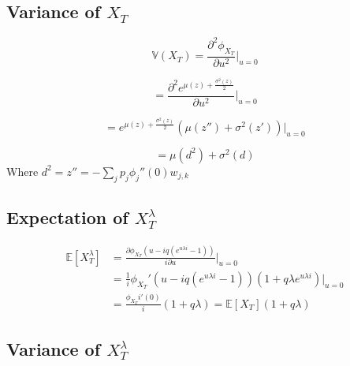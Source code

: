 \documentclass[12pt]{article}
\theoremstyle{definition}
\begin{document}
 \subsection{Variance of \(X_T\)}
 
\begin{equation}
\mathbb{V}(X_T)=\frac{\partial^2 \phi_{X_T}}{\partial u^2} \big|_{u=0}
\end{equation}

\begin{equation}
 =\frac{\partial ^2 e^{\mu(z)+\frac{\sigma^2(z)}{2} }}{\partial u^2} \bigg|_{u=0}\end{equation}
 
 \begin{equation}
 = e^{\mu(z)+\frac{\sigma^2(z)}{2} } \left(\mu(z'')+ \sigma^2 (z') \right) \bigg|_{u=0}\end{equation}
 
 \begin{equation}
 =\mu(d^2)+\sigma^2 (d)
 \end{equation}
 Where \(d^2=z''=-\sum_j p_j \phi_j''(0) w_{j, k} \)
 
 \subsection{Expectation of \(X_T ^ \lambda \)}


\begin{align} \mathbb{E}[X_T ^ \lambda]&=\frac{\partial \phi_{X_T}\left(u-iq(e^{u\lambda i}-1)\right) }{i\partial u} \bigg|_{u=0}\\
&=\frac{1}{i} \phi_{X_T}'\left(u-iq(e^{u\lambda i}-1)\right) \left(1+q\lambda e^{u\lambda i}\right) \big|_{u=0} \\
&=\frac{ \phi_{X_T}i ' (0)}{i}(1+q \lambda) = \mathbb{E}[X_T] (1+q \lambda)\end{align}

 
  \subsection{Variance of \(X_T ^ \lambda \)}
\end{document}
